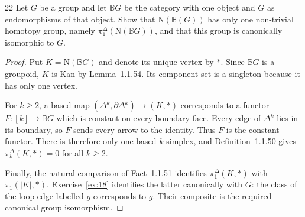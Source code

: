 \begin{exercise}{22}
Let $G$ be a group and let $\mathbb B G$ be the category with one
object and $G$ as endomorphisms of that object. Show that
$\mathrm N(\mathbb B(G))$ has only one non-trivial homotopy group,
namely $\pi_1^\Delta(\mathrm N(\mathbb B G))$, and that this group
is canonically isomorphic to $G$.

\begin{proof}
Put $K=\mathrm N(\mathbb B G)$ and denote its unique vertex by $*$.
Since $\mathbb B G$ is a groupoid, $K$ is Kan by Lemma~1.1.54.
Its component set is a singleton because it has only one vertex.

For $k\ge2$, a based map
$(\Delta^k,\partial\Delta^k)\to(K,*)$ corresponds to a functor
$F\colon[k]\to\mathbb B G$ which is constant on every boundary
face. Every edge of $\Delta^k$ lies in its boundary, so $F$ sends
every arrow to the identity. Thus $F$ is the constant functor.
There is therefore only one based $k$-simplex, and
Definition~1.1.50 gives $\pi_k^\Delta(K,*)=0$ for all $k\ge2$.

Finally, the natural comparison of Fact~1.1.51 identifies
$\pi_1^\Delta(K,*)$ with $\pi_1(|K|,*)$.
Exercise~\ref{ex:18} identifies the latter canonically with $G$:
the class of the loop edge labelled $g$ corresponds to $g$.
Their composite is the required canonical group isomorphism.
\end{proof}
\end{exercise}
